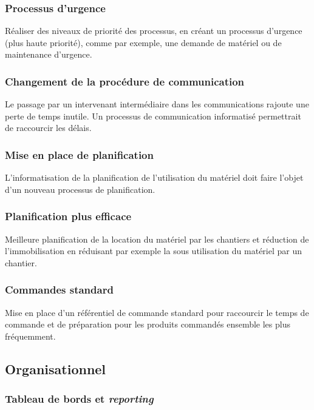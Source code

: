 \documentclass[twoside]{article}
\begin{document}
\subsubsection{Processus d’urgence}

Réaliser des niveaux de priorité des processus, en créant un processus d’urgence
 (plus haute priorité), comme par exemple, une demande de matériel 
ou de maintenance d’urgence.

\subsubsection{Changement de la procédure de communication}

Le passage par un intervenant intermédiaire dans les communications rajoute une 
perte de temps inutile. 
Un processus de communication informatisé permettrait de raccourcir les délais.

\subsubsection{Mise en place de planification}

L’informatisation de la planification de l’utilisation du matériel doit faire 
l’objet d’un nouveau processus de planification. 

\subsubsection{Planification plus efficace}

Meilleure planification de la location du matériel par les chantiers et 
réduction de l’immobilisation en réduisant par exemple la sous utilisation
du matériel par un chantier.

\subsubsection{Commandes standard}

Mise en place d'un référentiel de commande standard pour raccourcir le temps de
commande et de préparation pour les produits commandés ensemble les plus
fréquemment.


\subsection{Organisationnel}

\subsubsection{Tableau de bords et {\sl reporting}}
\end{document}

